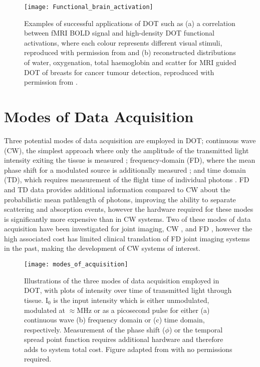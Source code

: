 \documentclass[twoside]{bhamthesis}
\theoremstyle{definition}
\begin{document}
\begin{figure}[!ht]
\centering
  \texttt{[image: Functional\_brain\_activation]}
\caption{Examples of successful applications of DOT such as (a) a correlation between fMRI BOLD signal and high-density DOT functional activations, where each colour represents different visual stimuli, reproduced with permission from \cite{eggebrecht2012quantitative} and (b) reconstructed distributions of water, oxygenation, total haemoglobin and scatter for MRI guided DOT of breasts for cancer tumour detection, reproduced with permission from \cite{carpenter2007image}.}
\label{fig:Breast_and_brain}
\end{figure}

\section{Modes of Data Acquisition}

Three potential modes of data acquisition are employed in DOT; continuous wave (CW), the simplest approach where only the amplitude of the transmitted light intensity exiting the tissue is measured \cite{xu2001imaging}; frequency-domain (FD), where the mean phase shift for a modulated source is additionally measured \cite{hielscher2011frequency}; and  time domain (TD), which requires measurement of the flight time of individual photons \cite{hebden2001three}. FD and TD data provides additional information compared to CW about the probabilistic mean pathlength of photons, improving the ability to separate scattering and absorption events, however the hardware required for these modes is significantly more expensive than in CW systems.  Two of these modes of data acquisition have been investigated for joint imaging, CW \cite{lighter2018multispectral,scheel2002assessment,schwaighofer2003classification},  and FD \cite{hielscher2011frequency,montejo2013computer2}, however the high associated cost has limited clinical translation of FD joint imaging systems in the past, making the development of CW systems of interest.

\begin{figure}[!ht]
  \centering
  \texttt{[image: modes\_of\_acquisition]}
\caption{Illustrations of the three modes of data acquisition employed in DOT, with plots of intensity over time of transmitted light through tissue. $\mathrm{I_0}$ is the input intensity which is either unmodulated, modulated at $\approx$MHz or as a picosecond pulse for either (a) continuous wave (b) frequency domain or (c) time domain, respectively. Measurement of the phase shift ($\phi$) or the temporal spread point function requires additional hardware and therefore adds to system total cost. Figure adapted from \cite{rupawala2018shining} with no permissions required.}
\end{figure}
\end{document}
